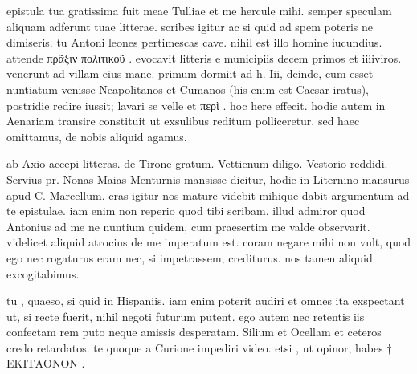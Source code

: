 


 epistula tua gratissima fuit meae Tulliae et me hercule mihi. semper speculam aliquam adferunt tuae litterae. scribes igitur ac si quid ad spem poteris ne dimiseris. tu Antoni leones pertimescas cave. nihil est illo homine iucundius. attende πρᾶξιν πολιτικοῦ . evocavit litteris e municipiis decem primos et iiiiviros. venerunt ad villam eius mane. primum dormiit ad h. Iii, deinde, cum esset nuntiatum venisse Neapolitanos et Cumanos (his enim est Caesar iratus), postridie redire iussit; lavari se velle et περὶ . hoc here effecit. hodie autem in Aenariam transire constituit ut exsulibus reditum polliceretur. sed haec omittamus, de nobis aliquid agamus.

 ab Axio accepi litteras. de Tirone gratum. Vettienum diligo. Vestorio reddidi. Servius pr. Nonas Maias Menturnis mansisse dicitur, hodie in Liternino mansurus apud C. Marcellum. cras igitur nos mature videbit mihique dabit argumentum ad te epistulae. iam enim non reperio quod tibi scribam. illud admiror quod Antonius ad me ne nuntium quidem, cum praesertim me valde observarit. videlicet aliquid atrocius de me imperatum est. coram negare mihi non vult, quod ego nec rogaturus eram nec, si impetrassem, crediturus. nos tamen aliquid excogitabimus.

 tu , quaeso, si quid in Hispaniis. iam enim poterit audiri et omnes ita exspectant ut, si recte fuerit, nihil negoti futurum putent. ego autem nec retentis iis confectam rem puto neque amissis desperatam. Silium et Ocellam et ceteros credo retardatos. te quoque a Curione impediri video. etsi , ut opinor, habes † ΕΚΙΤΑΟΝΟΝ .
